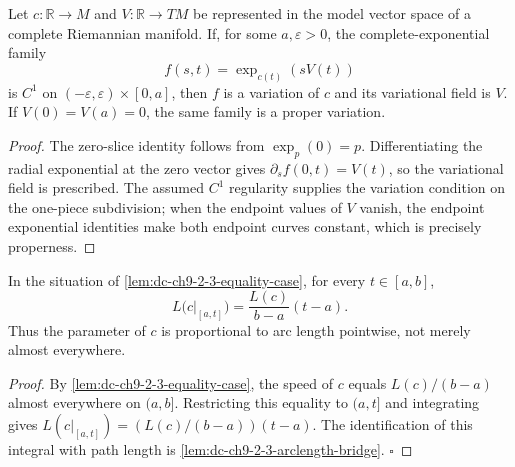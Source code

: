 \begin{lemma}
  \label{lem:dc-ch9-2-2-exponential}
  \leanok
  Let $c:\mathbb R\to M$ and $V:\mathbb R\to TM$ be represented in the model
  vector space of a complete Riemannian manifold.  If, for some $a,\varepsilon>0$,
  the complete-exponential family
  $$f(s,t)=\exp_{c(t)}(sV(t))$$
  is $C^1$ on $(-\varepsilon,\varepsilon)\times[0,a]$, then $f$ is a variation of
  $c$ and its variational field is $V$.  If $V(0)=V(a)=0$, the same family is a
  proper variation.
\end{lemma}
\begin{proof}
  \leanok
  The zero-slice identity follows from $\exp_p(0)=p$.  Differentiating the radial
  exponential at the zero vector gives
  $\partial_s f(0,t)=V(t)$, so the variational field is prescribed.  The assumed
  $C^1$ regularity supplies the variation condition on the one-piece subdivision;
  when the endpoint values of $V$ vanish, the endpoint exponential identities make
  both endpoint curves constant, which is precisely properness.
\end{proof}

\begin{lemma}
  \label{lem:dc-ch9-2-3-pointwise-arclength}
  \leanok
  In the situation of \cref{lem:dc-ch9-2-3-equality-case}, for every $t\in[a,b]$,
  $$
  L\big(c|_{[a,t]}\big)=\frac{L(c)}{b-a}(t-a).
  $$
  Thus the parameter of $c$ is proportional to arc length pointwise, not merely almost
  everywhere.
\end{lemma}
\begin{proof}
  \leanok
  By \cref{lem:dc-ch9-2-3-equality-case}, the speed of $c$ equals
  $L(c)/(b-a)$ almost everywhere on $(a,b]$. Restricting this equality to $(a,t]$ and
  integrating gives
  $L(c|_{[a,t]})=(L(c)/(b-a))(t-a)$. The identification of this integral with path length
  is \cref{lem:dc-ch9-2-3-arclength-bridge}. $\square$
\end{proof}


